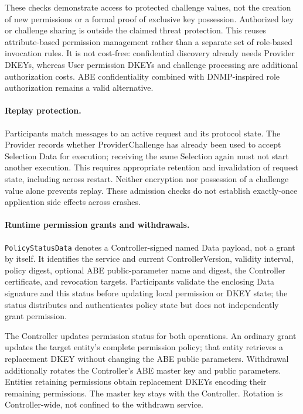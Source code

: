 These checks demonstrate access to protected challenge values, not the creation
of new permissions or a formal proof of exclusive key possession. Authorized
key or challenge sharing is outside the claimed threat protection. This reuses
attribute-based permission management rather
than a separate set of role-based invocation rules. It is not cost-free: confidential
discovery already needs Provider DKEYs, whereas User permission DKEYs and
challenge processing are additional authorization costs. ABE confidentiality
combined with DNMP-inspired role authorization remains a valid alternative.

\paragraph{Replay protection.}
Participants match messages to an active request and its protocol state. The
Provider records whether ProviderChallenge has already been used to accept
Selection Data for execution; receiving the same Selection again must not start
another execution. This requires appropriate retention and invalidation of
request state, including across restart. Neither encryption nor possession of
a challenge value alone prevents replay. These admission checks do not establish
exactly-once application side effects across crashes.

\paragraph{Runtime permission grants and withdrawals.}

\texttt{PolicyStatusData} denotes a Controller-signed named Data payload,
not a grant by itself. It identifies the service and current ControllerVersion,
validity interval, policy digest, optional ABE public-parameter name and digest,
the Controller certificate, and revocation targets. Participants validate the
enclosing Data signature and this status before updating local permission or
DKEY state; the status distributes and authenticates policy state but does not
independently grant permission.

The Controller updates permission status for both operations. An ordinary grant
updates the target entity's complete permission policy; that entity retrieves
a replacement DKEY without changing the ABE public parameters. Withdrawal
additionally rotates the Controller's ABE master key and public parameters.
Entities retaining permissions obtain replacement DKEYs encoding their remaining
permissions. The master key stays with the Controller. Rotation is Controller-wide,
not confined to the withdrawn service.

